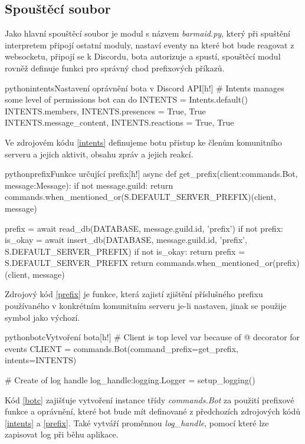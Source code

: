 \documentclass[
  program=inf,
biblatex=false,
sourcecodes=true,
joinlists=true,
  figures=true,
  tables=true,
  glossaries=true,
  index=false
]{kidiplom}
\begin{document}
\subsection{Spouštěcí soubor}
Jako hlavní spouštěcí soubor je modul s názvem {\it barmaid.py}, který 
při spuštění interpretem připojí ostatní moduly, nastaví eventy na které bot bude reagovat z websocketu,
připojí se k Discordu, bota autorizuje a spustí, spouštěcí modul rovněž definuje funkci pro správný
chod prefixových příkazů.

\begin{kicode}{python}{intents}{Nastavení oprávnění bota v Discord API}[h!]
  # Intents manages some level of permissions bot can do
  INTENTS = Intents.default()
  INTENTS.members, INTENTS.presences = True, True
  INTENTS.message_content, INTENTS.reactions = True, True
\end{kicode}

Ve zdrojovém kódu \ref{intents} definujeme botu přístup ke členům komunitního serveru a jejich aktivit,
obsahu zpráv a jejich reakcí.

\begin{kicode}{python}{prefix}{Funkce určující prefix}[h!]
  async def get_prefix(client:commands.Bot, message:Message):
    if not message.guild:
        return commands.when_mentioned_or(S.DEFAULT_SERVER_PREFIX)(client, message)
    
    prefix = await read_db(DATABASE, message.guild.id, 'prefix')
    if not prefix:
        is_okay = await insert_db(DATABASE, message.guild.id, 'prefix', S.DEFAULT_SERVER_PREFIX)
        if not is_okay:
            return
        prefix = S.DEFAULT_SERVER_PREFIX
    return commands.when_mentioned_or(prefix)(client, message)
\end{kicode}

Zdrojový kód \ref{prefix} je funkce, která zajistí zjištění příslušného prefixu používaného
v konkrétním komunitním serveru je-li nastaven, jinak se použije symbol  jako výchozí.

\begin{kicode}{python}{botc}{Vytvoření bota}[h!]
  # Client is top level var because of @ decorator for events
  CLIENT = commands.Bot(command_prefix=get_prefix, intents=INTENTS)
  
  # Create of log handle
  log_handle:logging.Logger = setup_logging()
\end{kicode}

Kód \ref{botc} zajišťuje vytvoření instance třídy {\it commands.Bot} za použití 
prefixové funkce a oprávnění, které bot bude mít definované z předchozích zdrojových kódů \ref{intents} a \ref{prefix}.
Také vytváří proměnnou {\it log\_handle}, pomocí které lze zapisovat log při běhu aplikace.
\end{document}

